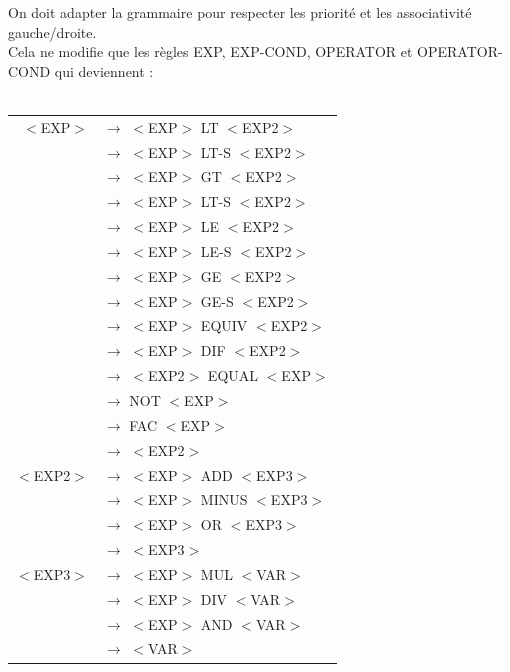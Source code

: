 \documentclass[a4paper,10pt]{article}
\begin{document}
On doit adapter la grammaire pour respecter les priorité et les associativité gauche/droite.\\
Cela ne modifie que les règles EXP, EXP-COND, OPERATOR et OPERATOR-COND qui deviennent : \\
~\\



\begin{tabular}{rl}


$<$EXP$>$			& $\rightarrow$ $<$EXP$>$ LT $<$EXP2$>$\\
					& $\rightarrow$ $<$EXP$>$ LT-S $<$EXP2$>$\\
					& $\rightarrow$ $<$EXP$>$ GT $<$EXP2$>$\\
					& $\rightarrow$ $<$EXP$>$ LT-S $<$EXP2$>$\\
					& $\rightarrow$ $<$EXP$>$ LE $<$EXP2$>$\\
					& $\rightarrow$ $<$EXP$>$ LE-S $<$EXP2$>$\\
					& $\rightarrow$ $<$EXP$>$ GE $<$EXP2$>$\\
					& $\rightarrow$ $<$EXP$>$ GE-S $<$EXP2$>$\\
					& $\rightarrow$ $<$EXP$>$ EQUIV $<$EXP2$>$\\
					& $\rightarrow$ $<$EXP$>$ DIF $<$EXP2$>$\\
					& $\rightarrow$ $<$EXP2$>$ EQUAL $<$EXP$>$\\
					& $\rightarrow$ NOT $<$EXP$>$ \\
					& $\rightarrow$ FAC $<$EXP$>$ \\
					& $\rightarrow$ $<$EXP2$>$ \\
										
					
$<$EXP2$>$			& $\rightarrow$ $<$EXP$>$ ADD $<$EXP3$>$\\
					& $\rightarrow$ $<$EXP$>$ MINUS $<$EXP3$>$\\
					& $\rightarrow$ $<$EXP$>$ OR $<$EXP3$>$\\
					& $\rightarrow$ $<$EXP3$>$\\
					
$<$EXP3$>$			& $\rightarrow$ $<$EXP$>$ MUL $<$VAR$>$\\
					& $\rightarrow$ $<$EXP$>$ DIV $<$VAR$>$\\
					& $\rightarrow$ $<$EXP$>$ AND $<$VAR$>$\\
					& $\rightarrow$ $<$VAR$>$\\
\end{tabular}
\end{document}
